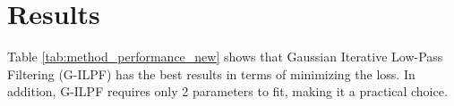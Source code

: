 \documentclass[iucr,review]{iucrjournals}
\begin{document}

\section{Results}
Table \ref{tab:method_performance_new} shows that Gaussian Iterative Low-Pass Filtering (G-ILPF)
has the best results in terms of minimizing the loss.
In addition, G-ILPF requires only 2 parameters to fit, making it a practical choice.

\end{document}
